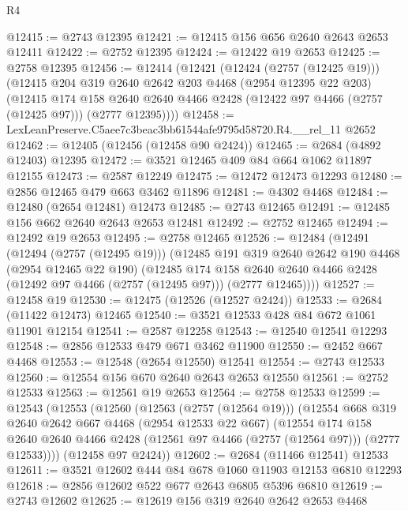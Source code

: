 \begin{lexlean}{R4}
\begin{coremodule}
@12415 := @2743 @12395
@12421 := @12415 @156 @656 @2640 @2643 @2653 @12411
@12422 := @2752 @12395
@12424 := @12422 @19 @2653
@12425 := @2758 @12395
@12456 := @12414
    (@12421
      (@12424 (@2757 (@12425 @19)))
      (@12415
        @204
        @319
        @2640
        @2642
        @203
        @4468
        (@2954 @12395 @22 @203)
        (@12415
          @174
          @158
          @2640
          @2640
          @4466
          @2428
          (@12422 @97 @4466 (@2757 (@12425 @97)))
          (@2777 @12395))))
@12458 := LexLeanPreserve.C5aee7c3beac3bb61544afe9795d58720.R4.__rel_11 @2652
@12462 := @12405 (@12456 (@12458 @90 @2424))
@12465 := @2684 (@4892 @12403) @12395
@12472 := @3521 @12465 @409 @84 @664 @1062 @11897 @12155
@12473 := @2587 @12249
@12475 := @12472 @12473 @12293
@12480 := @2856 @12465 @479 @663 @3462 @11896
@12481 := @4302 @4468
@12484 := @12480 (@2654 @12481) @12473
@12485 := @2743 @12465
@12491 := @12485 @156 @662 @2640 @2643 @2653 @12481
@12492 := @2752 @12465
@12494 := @12492 @19 @2653
@12495 := @2758 @12465
@12526 := @12484
    (@12491
      (@12494 (@2757 (@12495 @19)))
      (@12485
        @191
        @319
        @2640
        @2642
        @190
        @4468
        (@2954 @12465 @22 @190)
        (@12485
          @174
          @158
          @2640
          @2640
          @4466
          @2428
          (@12492 @97 @4466 (@2757 (@12495 @97)))
          (@2777 @12465))))
@12527 := @12458 @19
@12530 := @12475 (@12526 (@12527 @2424))
@12533 := @2684 (@11422 @12473) @12465
@12540 := @3521 @12533 @428 @84 @672 @1061 @11901 @12154
@12541 := @2587 @12258
@12543 := @12540 @12541 @12293
@12548 := @2856 @12533 @479 @671 @3462 @11900
@12550 := @2452 @667 @4468
@12553 := @12548 (@2654 @12550) @12541
@12554 := @2743 @12533
@12560 := @12554 @156 @670 @2640 @2643 @2653 @12550
@12561 := @2752 @12533
@12563 := @12561 @19 @2653
@12564 := @2758 @12533
@12599 := @12543
    (@12553
      (@12560
        (@12563 (@2757 (@12564 @19)))
        (@12554
          @668
          @319
          @2640
          @2642
          @667
          @4468
          (@2954 @12533 @22 @667)
          (@12554
            @174
            @158
            @2640
            @2640
            @4466
            @2428
            (@12561 @97 @4466 (@2757 (@12564 @97)))
            (@2777 @12533))))
      (@12458 @97 @2424))
@12602 := @2684 (@11466 @12541) @12533
@12611 := @3521 @12602 @444 @84 @678 @1060 @11903 @12153 @6810 @12293
@12618 := @2856 @12602 @522 @677 @2643 @6805 @5396 @6810
@12619 := @2743 @12602
@12625 := @12619 @156 @319 @2640 @2642 @2653 @4468

\end{coremodule}
\end{lexlean}
